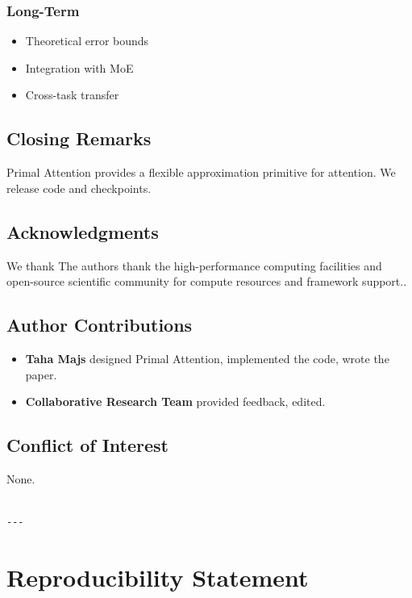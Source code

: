 \subsubsection{Long-Term}
\begin{itemize}
\item Theoretical error bounds
\item Integration with MoE
\item Cross-task transfer

\end{itemize}
\subsection{Closing Remarks}

Primal Attention provides a flexible approximation primitive for attention. 
We release code and checkpoints.

\subsection{Acknowledgments}

We thank The authors thank the high-performance computing facilities and open-source scientific community for compute resources and framework support..

\subsection{Author Contributions}

\begin{itemize}
\item \textbf{Taha Majs} designed Primal Attention, implemented the code, wrote the paper.
\item \textbf{Collaborative Research Team} provided feedback, edited.

\end{itemize}
\subsection{Conflict of Interest}

None.
\begin{lstlisting}

---
\end{lstlisting}


\section{Reproducibility Statement}

